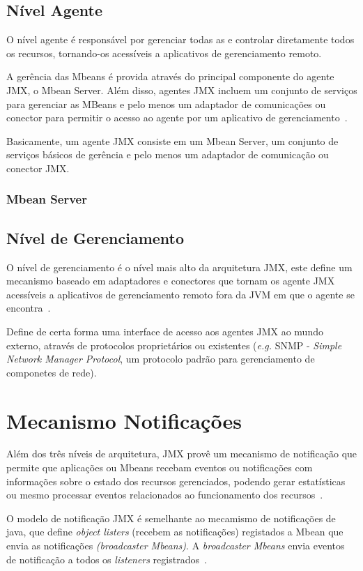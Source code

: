 \subsection{Nível Agente}
O nível agente é responsável por gerenciar todas as e controlar diretamente todos os recursos, tornando-os acessíveis a aplicativos de gerenciamento remoto.

A gerência das Mbeans é provida através do principal componente do agente JMX, o Mbean Server. Além disso, agentes JMX incluem um conjunto de serviços para gerenciar as MBeans e pelo menos um adaptador de comunicações ou conector para permitir o acesso ao agente por um aplicativo de gerenciamento~\cite{jmx}.

Basicamente, um agente JMX consiste em um Mbean Server, um conjunto de serviços básicos de gerência e pelo menos um adaptador de comunicação ou conector JMX.

\subsubsection{Mbean Server}

\subsection{Nível de Gerenciamento}
O nível de gerenciamento é o nível mais alto da arquitetura JMX, este define um mecanismo baseado em adaptadores e conectores que tornam os agente JMX acessíveis a aplicativos de gerenciamento remoto fora da JVM em que o agente se encontra~\cite{jmx}.

Define de certa forma uma interface de acesso aos agentes JMX ao mundo externo, através de protocolos proprietários ou existentes (\textit{e.g.} SNMP - \textit{Simple Network Manager Protocol}, um protocolo padrão para gerenciamento de componetes de rede).

\section{Mecanismo Notificações}
Além dos três níveis de arquitetura, JMX provê um mecanismo de notificação que permite que aplicações ou Mbeans recebam eventos ou notificações com informações sobre o estado dos recursos gerenciados, podendo gerar estatísticas ou mesmo processar eventos relacionados ao funcionamento dos recursos~\cite{lindfors2002jmx}.

O modelo de notificação JMX é semelhante ao mecamismo de notificações de java, que define \textit{object listers} (recebem as notificações) registados a Mbean que envia as notificações \textit{(broadcaster Mbeans)}. A \textit{broadcaster Mbeans} envia eventos de notificação a todos os \textit{listeners} registrados~\cite{lindfors2002jmx}.

